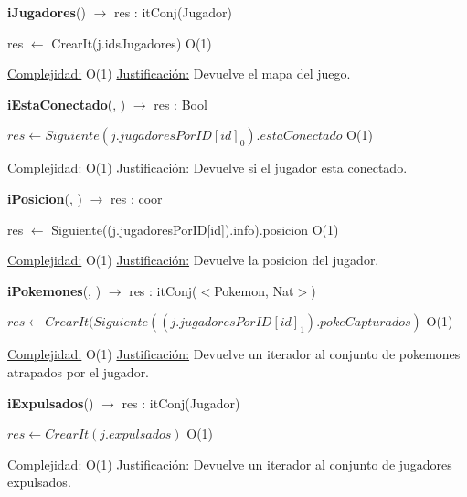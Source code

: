 \begin{algorithm}[H]{\textbf{iJugadores}() $\to$ res : itConj(Jugador)} 
	{}
	\begin{algorithmic}
		\State res $\gets$ CrearIt(j.idsJugadores)	\Comment O(1)
	
		\medskip
		\Statex \underline{Complejidad:} O(1)
		\Statex \underline{Justificación:} Devuelve el mapa del juego.
    \end{algorithmic}
\end{algorithm}

\begin{algorithm}[H]{\textbf{iEstaConectado}(, ) $\to$ res : Bool} 
	{}
	\begin{algorithmic}
		\State $res \gets Siguiente(j.jugadoresPorID[id]_0).estaConectado $ \Comment O(1)
	
		\medskip
		\Statex \underline{Complejidad:} O(1)
		\Statex \underline{Justificación:} Devuelve si el jugador esta conectado.
    \end{algorithmic}
\end{algorithm}

\begin{algorithm}[H]{\textbf{iPosicion}(, ) $\to$ res : coor} 
	{}
	\begin{algorithmic}
		\State res $\gets$ Siguiente((j.jugadoresPorID[id]).info).posicion  \Comment O(1)
	
		\medskip
		\Statex \underline{Complejidad:} O(1)
		\Statex \underline{Justificación:} Devuelve la posicion del jugador.
    \end{algorithmic}
\end{algorithm}

\begin{algorithm}[H]{\textbf{iPokemones}(, ) $\to$ res : itConj($<$Pokemon, Nat$>$)} 
	{}
	\begin{algorithmic}
		\State $res \gets CrearIt(Siguiente((j.jugadoresPorID[id]_1).pokeCapturados) $ \Comment O(1)
	
		\medskip
		\Statex \underline{Complejidad:} O(1)
		\Statex \underline{Justificación:} Devuelve un iterador al conjunto de pokemones atrapados por el jugador.
    \end{algorithmic}
\end{algorithm}

\begin{algorithm}[H]{\textbf{iExpulsados}() $\to$ res : itConj(Jugador)} 
	{}
	\begin{algorithmic}
		\State $res \gets CrearIt(j.expulsados) $ \Comment O(1)
	
		\medskip
		\Statex \underline{Complejidad:} O(1)
		\Statex \underline{Justificación:} Devuelve un iterador al conjunto de jugadores expulsados.
    \end{algorithmic}
\end{algorithm}

